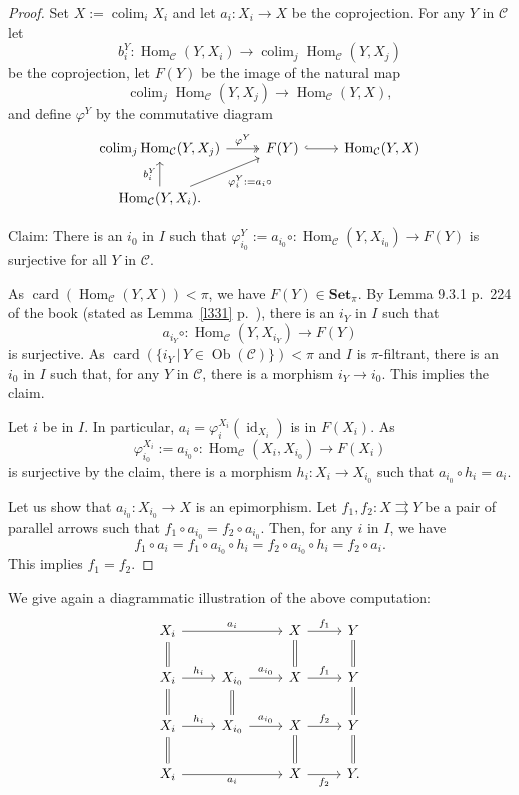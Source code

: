 \documentclass[12pt]{article}%
\theoremstyle{remark}
\theoremstyle{definition}
\newcommand{\C}{\mathcal C}
\newcommand{\Set}{\mathbf{Set}}%
\newcommand{\pp}{\varphi}
\newcommand{\parar}{\rightrightarrows}
\DeclareMathOperator*{\colim}{colim}%
\DeclareMathOperator{\card}{card}%
\DeclareMathOperator{\id}{id}
\DeclareMathOperator{\Hom}{Hom}%
\DeclareMathOperator{\Ob}{Ob}
\begin{document}
\begin{proof}
Set $X:=\colim_iX_i$ and let $a_i:X_i\to X$ be the coprojection. For any $Y$ in $\C$ let 
$$
b^Y_i:\Hom_\C(Y,X_i)\to\colim_j\Hom_\C(Y,X_j)
$$ 
be the coprojection, let $F(Y)$ be the image of the natural map 
$$
\colim_j\Hom_\C(Y,X_j)\to\Hom_\C(Y,X),
$$ 
and define $\pp^Y$ by the commutative diagram 
$$
\begin{tikzcd}
\colim_j\Hom_\C(Y,X_j)\ar[two heads]{r}{\pp^Y}&F(Y)\ar[hook]{r}&\Hom_\C(Y,X)\\ 
\Hom_\C(Y,X_i).\ar{u}{b^Y_i}\ar{ur}[swap]{\pp^Y_i:=a_i\circ}
\end{tikzcd}
$$ 

Claim: There is an $i_0$ in $I$ such that $\pp^Y_{i_0}:=a_{i_0}\circ:\Hom_\C(Y,X_{i_0})\to F(Y)$ is surjective for all $Y$ in $\C$.

As $\card(\Hom_\C(Y,X))<\pi$, we have $F(Y)\in\Set_\pi$. By Lemma 9.3.1 p.~224 of the book (stated as Lemma~\ref{l331} p.~\pageref{l331}), there is an $i_Y$ in $I$ such that 
$$
a_{i_Y}\circ:\Hom_\C(Y,X_{i_Y})\to F(Y)
$$ 
is surjective. As $\card(\{i_Y\,|\,Y\in\Ob(\C)\})<\pi$ and $I$ is $\pi$-filtrant, there is an $i_0$ in $I$ such that, for any $Y$ in $\C$, there is a morphism $i_Y\to i_0$. This implies the claim. 

Let $i$ be in $I$. In particular, $a_i=\pp^{X_i}_i(\id_{X_i})$ is in $F(X_i)$. As 
$$
\pp^{X_i}_{i_0}:=a_{i_0}\circ:\Hom_\C(X_i,X_{i_0})\to F(X_i)
$$ 
is surjective by the claim, there is a morphism $h_i:X_i\to X_{i_0}$ such that $a_{i_0}\circ h_i=a_i$. 

Let us show that $a_{i_0}:X_{i_0}\to X$ is an epimorphism. Let $f_1,f_2:X\parar Y$ be a pair of parallel arrows such that $f_1\circ a_{i_0}=f_2\circ a_{i_0}$. Then, for any $i$ in $I$, we have 
$$
f_1\circ a_i=f_1\circ a_{i_0}\circ h_i=f_2\circ a_{i_0}\circ h_i=f_2\circ a_i.
$$ 
This implies $f_1=f_2$.
\end{proof}

We give again a diagrammatic illustration of the above computation:
$$
\begin{tikzcd}
X_i\ar[equal]{d}\ar{rr}{a_i}&&X\ar[equal]{d}\ar{r}{f_1}&Y\ar[equal]{d}\\ 
X_i\ar[equal]{d}\ar{r}{h_i}&X_{i_0}\ar[equal]{d}\ar{r}{a_{i_0}}&X\ar{r}{f_1}&Y\ar[equal]{d}\\ 
X_i\ar[equal]{d}\ar{r}{h_i}&X_{i_0}\ar{r}{a_{i_0}}&X\ar[equal]{d}\ar{r}{f_2}&Y\ar[equal]{d}\\ 
X_i\ar{rr}[swap]{a_i}&&X\ar{r}[swap]{f_2}&Y.
\end{tikzcd}
$$ 
\end{document}
